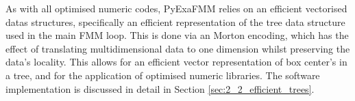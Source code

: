 As with all optimised numeric codes, \gls{PyExaFMM} relies on an efficient
vectorised datas structures, specifically an efficient representation of the tree
data structure used in the main \gls{FMM} loop. This is done via an Morton encoding,
which has the effect of translating multidimensional data to one dimension whilst
preserving the data's locality. This allows for an efficient vector representation
of box center's in a tree, and for the application of optimised numeric libraries.
The software implementation is discussed in detail in Section \ref{sec:2_2_efficient_trees}.
